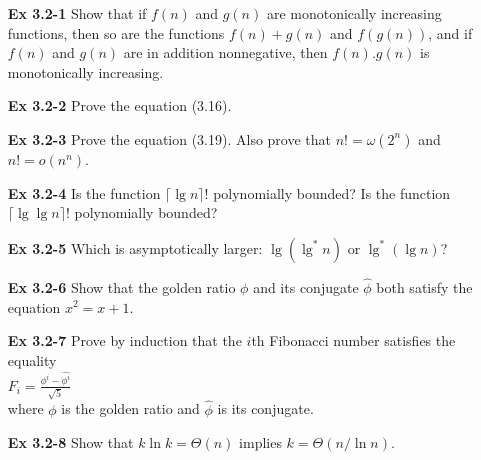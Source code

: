 \documentclass[fontsize=12pt,paper=a4]{book}
\begin{document}
\begin{enumerate}
 \item[\textbf{Ex 3.2-1}]
       Show that if $f(n)$ and $g(n)$ are monotonically increasing functions, then so are the functions $f(n) + g(n)$ and $f(g(n))$, and if $f(n)$ and $g(n)$ are in addition nonnegative, then $f(n) . g(n)$ is monotonically increasing.
       
 \item[\textbf{Ex 3.2-2}]
       Prove the equation (3.16).
       
 \item[\textbf{Ex 3.2-3}]
       Prove the equation (3.19). Also prove that $n! = \omega(2^n)$ and $n! = o(n^n)$.
       
 \item[\textbf{Ex 3.2-4}]
       Is the function $\lceil \lg n \rceil !$ polynomially bounded? Is the function $\lceil \lg \lg n \rceil !$ polynomially bounded?
       
 \item[\textbf{Ex 3.2-5}]
       Which is asymptotically larger: $\lg(\lg^* n)$ or $\lg^*(\lg n)$?
       
 \item[\textbf{Ex 3.2-6}]
       Show that the golden ratio $\phi$ and its conjugate $\hat{\phi}$ both satisfy the equation $x^2 = x + 1$.
       
 \item[\textbf{Ex 3.2-7}]
       Prove by induction that the $i$th Fibonacci number satisfies the equality \\
       $F_i = \frac{\phi^i - \hat{\phi^i}}{\sqrt{5}}$ \\
       where $\phi$ is the golden ratio and $\hat{\phi}$ is its conjugate.
       
 \item[\textbf{Ex 3.2-8}]
       Show that $k \ln k = \Theta(n)$ implies $k=\Theta (n/\ln n)$.
\end{enumerate}
\end{document}
